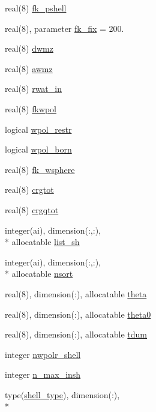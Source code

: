 \begin{DoxyCompactItemize}
\item 
real(8) \hyperlink{classmd_a9cf8babc8459710c3746e62d536652b9}{fk\-\_\-pshell}
\item 
real(8), parameter \hyperlink{classmd_a80630bc13d0b69db27dac5a0406c27ea}{fk\-\_\-fix} = 200.
\item 
real(8) \hyperlink{classmd_a5b292ee2f5858a00b745d579c2562480}{dwmz}
\item 
real(8) \hyperlink{classmd_a35b1e32ed1c6839f33b1cdd45c869c9d}{awmz}
\item 
real(8) \hyperlink{classmd_a021a8fe94b77593045a45d33c3c352c6}{rwat\-\_\-in}
\item 
real(8) \hyperlink{classmd_a84bcb46a25be5a1296c920b70d1ccbcb}{fkwpol}
\item 
logical \hyperlink{classmd_ac3c563ce9e3f84e9532f17144c5f67b0}{wpol\-\_\-restr}
\item 
logical \hyperlink{classmd_ad8a49d857cf76b62d113486eeee13176}{wpol\-\_\-born}
\item 
real(8) \hyperlink{classmd_a2b58774088e4de21731bf80f51c72b72}{fk\-\_\-wsphere}
\item 
real(8) \hyperlink{classmd_a275c00abe17b57f21ec87c8931bba4ed}{crgtot}
\item 
real(8) \hyperlink{classmd_aee43ff7abaa6826662de08f51f40bef4}{crgqtot}
\item 
integer(ai), dimension(\-:,\-:), \\*
allocatable \hyperlink{classmd_a1bafa05e609654146f643daa94e4d47a}{list\-\_\-sh}
\item 
integer(ai), dimension(\-:,\-:), \\*
allocatable \hyperlink{classmd_a188ec90acd1a6249684af6b006f36e88}{nsort}
\item 
real(8), dimension(\-:), allocatable \hyperlink{classmd_a2c4dd1237d2d9dfd2fc0b7e0fc2982b9}{theta}
\item 
real(8), dimension(\-:), allocatable \hyperlink{classmd_a7a9a5e46cd47f2cbce7f1efd82c22a4f}{theta0}
\item 
real(8), dimension(\-:), allocatable \hyperlink{classmd_a306199abbe1732a3f31f0b5f7a80f249}{tdum}
\item 
integer \hyperlink{classmd_a41255490154352513bb18e9b612f8866}{nwpolr\-\_\-shell}
\item 
integer \hyperlink{classmd_a14a145b4c00d0726456c5e8bd9934b64}{n\-\_\-max\-\_\-insh}
\item 
type(\hyperlink{structmd_1_1shell__type}{shell\-\_\-type}), dimension(\-:), \\*

\end{DoxyCompactItemize}
